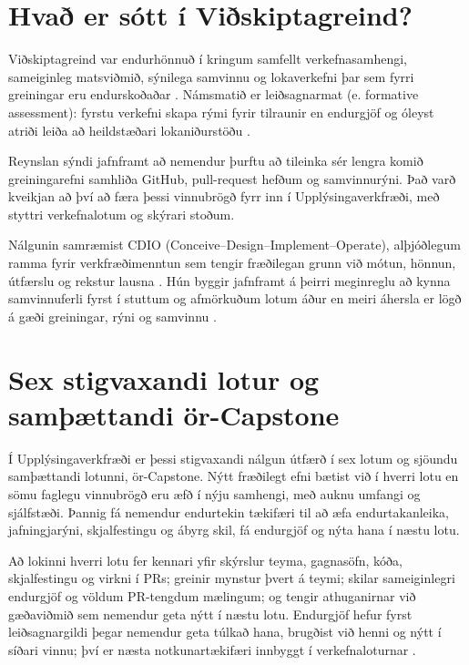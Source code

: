 \documentclass{kennsluakademia_conf}
\begin{document}
\section{Hvað er sótt í
Viðskiptagreind?}\label{hvauxf0-er-suxf3tt-uxed-viuxf0skiptagreind}

Viðskiptagreind var endurhönnuð í kringum samfellt verkefnasamhengi,
sameiginleg matsviðmið, sýnilega samvinnu og lokaverkefni þar sem fyrri
greiningar eru endurskoðaðar
\citep{Ingimundardottir2025Setberg, Ingimundardottir2026Industry}.
Námsmatið er leiðsagnarmat (e. formative assessment): fyrstu verkefni
skapa rými fyrir tilraunir en endurgjöf og óleyst atriði leiða að
heildstæðari lokaniðurstöðu \citep{Sadler1989FormativeAssessment}.

Reynslan sýndi jafnframt að nemendur þurftu að tileinka sér lengra komið
greiningarefni samhliða GitHub, pull-request hefðum og samvinnurýni. Það
varð kveikjan að því að færa þessi vinnubrögð fyrr inn í
Upplýsingaverkfræði, með styttri verkefnalotum og skýrari stoðum.

Nálgunin samræmist CDIO (Conceive--Design--Implement--Operate),
alþjóðlegum ramma fyrir verkfræðimenntun sem tengir fræðilegan grunn við
mótun, hönnun, útfærslu og rekstur lausna
\citep{CDIOInitiativeStandards30, EdstromKolmos2014PBLCDIO}. Hún byggir
jafnframt á þeirri meginreglu að kynna samvinnuferli fyrst í stuttum og
afmörkuðum lotum áður en meiri áhersla er lögð á gæði greiningar, rýni
og samvinnu \citep{Ingimundardottir2026GitHub}.

\section{Sex stigvaxandi lotur og samþættandi
ör-Capstone}\label{sex-stigvaxandi-lotur-og-samuxfeuxe6ttandi-uxf6r-capstone}

Í Upplýsingaverkfræði er þessi stigvaxandi nálgun útfærð í sex lotum og
sjöundu samþættandi lotunni, ör-Capstone. Nýtt fræðilegt efni bætist við
í hverri lotu en sömu faglegu vinnubrögð eru æfð í nýju samhengi, með
auknu umfangi og sjálfstæði. Þannig fá nemendur endurtekin tækifæri til
að æfa endurtakanleika, jafningjarýni, skjalfestingu og ábyrg skil, fá
endurgjöf og nýta hana í næstu lotu.

Að lokinni hverri lotu fer kennari yfir skýrslur teyma, gagnasöfn, kóða,
skjalfestingu og virkni í PRs; greinir mynstur þvert á teymi; skilar
sameiginlegri endurgjöf og völdum PR-tengdum mælingum; og tengir
athuganirnar við gæðaviðmið sem nemendur geta nýtt í næstu lotu.
Endurgjöf hefur fyrst leiðsagnargildi þegar nemendur geta túlkað hana,
brugðist við henni og nýtt í síðari vinnu; því er næsta notkunartækifæri
innbyggt í verkefnaloturnar
\citep{BoudMolloy2013FeedbackDesign, CarlessBoud2018FeedbackLiteracy}.
\end{document}

